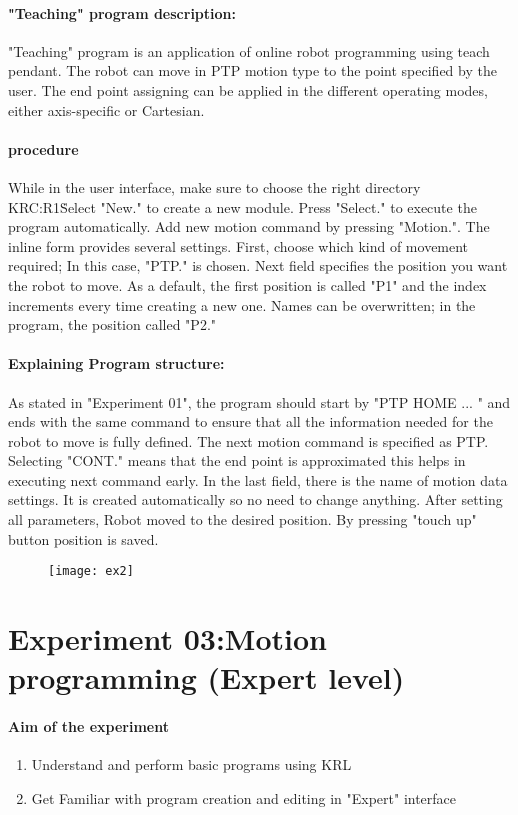 \paragraph{"Teaching" program description:} 
"Teaching" program is an application of online robot programming using teach pendant. The robot can move in PTP motion type to the point specified by the user. The end point assigning can be applied in the different operating modes, either axis-specific or Cartesian.
\paragraph{procedure}
While in the user interface, make sure to choose the right directory KRC:R1\.Select "New." to create a new module. 
Press "Select." to execute the program automatically.
Add new motion command by pressing "Motion.". The inline form provides several settings. First, choose which kind of movement required; In this case, "PTP." is chosen. 
Next field specifies the position you want the robot to move. As a default, the first position is called "P1" and the index increments every time creating a new one. Names can be overwritten; in the program, the position called "P2."
\newpage
\paragraph{Explaining Program structure:}
As stated in "Experiment 01", the program should start by "PTP HOME  ... " and ends with the same command to ensure that all the information needed for the robot to move is fully defined. 
The next motion command is specified as PTP. Selecting "CONT." means that the end point is approximated this helps in executing next command early. In the last field, there is the name of motion data settings. It is created automatically so no need to change anything.
After setting all parameters, Robot moved to the desired position. By pressing "touch up" button position is saved.

\begin{figure}[H]
	\centering
	\texttt{[image: ex2]}
\end{figure}
\newpage
\section{Experiment 03:Motion programming (Expert level)}
\paragraph{Aim of the experiment}
\begin{enumerate}
	\item Understand and perform basic programs using KRL
	\item Get Familiar with program creation and editing in "Expert" interface
\end{enumerate}
